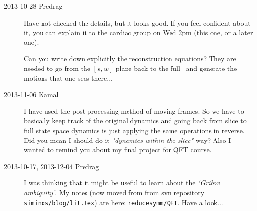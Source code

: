 \begin{description}
\item[2013-10-28 Predrag] Have not checked the details, but it looks
good. If you feel confident about it, you can explain it to the
cardiac group on Wed 2pm (this one, or a later one).

Can you write down explicitly the
{reconstruction equations}? They are needed to go from the $[s,w]$ plane
back to the full \statesp\ and generate the motions that one sees
there...

\item[2013-11-06 Kamal] I have used the post-processing method of moving frames. So we have to basically keep track of the original dynamics and going back from slice to full state space dynamics is just applying the same operations in reverse. Did you mean I should do it \emph{"dynamics within the slice"} way? Also I wanted to remind you about my final project for QFT course.
    
\item[2013-10-17, 2013-12-04 Predrag] I was thinking that it might be useful to
learn about the \emph{`Gribov ambiguity'}. My notes (now moved from from svn repository
\\
\texttt{siminos/blog/lit.tex}) are here:
 {\texttt{reducesymm/QFT}}. Have a look...

\end{description}
\renewcommand{\ssp}{a}
